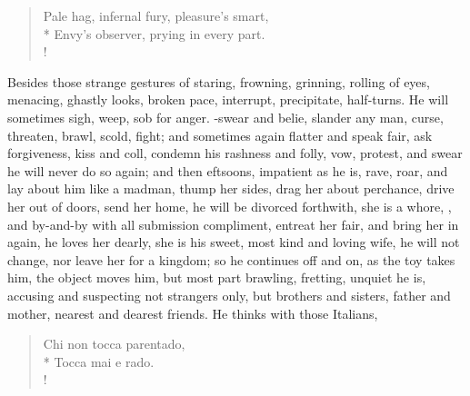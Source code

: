 \begin{verse}
Pale hag, infernal fury, pleasure's smart,\\*
Envy's observer, prying in every part.\\!
\end{verse}

Besides those strange gestures of staring, frowning, grinning, rolling
of eyes, menacing, ghastly looks, broken pace, interrupt, precipitate,
half-turns. He will sometimes sigh, weep, sob for anger. -swear and belie, slander any
man, curse, threaten, brawl, scold, fight; and sometimes again flatter
and speak fair, ask forgiveness, kiss and coll, condemn his rashness
and folly, vow, protest, and swear he will never do so again; and then
eftsoons, impatient as he is, rave, roar, and lay about him like a
madman, thump her sides, drag her about perchance, drive her out of
doors, send her home, he will be divorced forthwith, she is a whore,
\etc{}, and by-and-by with all submission compliment, entreat her fair,
and bring her in again, he loves her dearly, she is his sweet, most
kind and loving wife, he will not change, nor leave her for a kingdom;
so he continues off and on, as the toy takes him, the object moves him,
but most part brawling, fretting, unquiet he is, accusing and
suspecting not strangers only, but brothers and sisters, father and
mother, nearest and dearest friends. He thinks with those Italians,
%
\begin{latin}%
\begin{verse}%
Chi non tocca parentado,\\*
Tocca mai e rado.\\!
\end{verse}%
\end{latin}%

